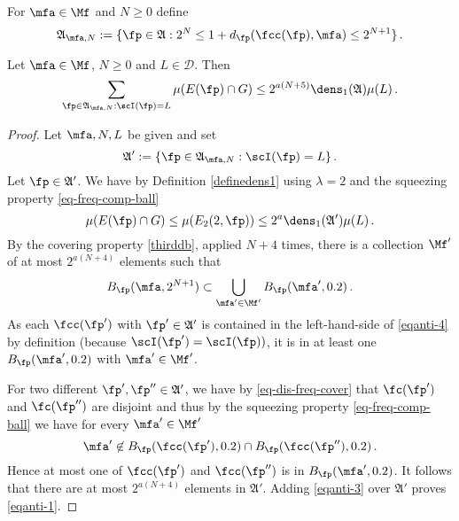 For $\mfa \in \Mf$ and $N\ge 0$ define
\begin{equation}\label{eqantidefap}
    \mathfrak{A}_{\mfa,N}:=\{\fp\in\mathfrak{A}: 2^{N}\le 1+d_{\fp}(\fcc(\fp), \mfa)\le 2^{N+1}\} \, .
\end{equation}


\begin{lemma}
\label{stack-density}
\leanok
{}
Let $\mfa \in \Mf$, $N\ge 0$ and
$L\in \mathcal{D}$. Then
\begin{equation}\label{eqanti-1}
    \sum_{\fp\in\mathfrak{A}_{\mfa,N}:\scI(\fp)=L}\mu(E(\fp)\cap G)\le 2^{a(N+5)}\dens_1(\mathfrak{A})\mu(L)\, .
\end{equation}
\end{lemma}
\begin{proof}
\leanok
Let $\mfa,N,L$ be given and set
\begin{equation}
\mathfrak{A}':=\{\fp\in\mathfrak{A}_{\mfa,N}:\scI(\fp)=L\}\, .
\end{equation}
Let
$\fp\in\mathfrak{A}'$.
We have
by Definition \eqref{definedens1}
using $\lambda=2$ and the squeezing property \eqref{eq-freq-comp-ball}
\begin{equation}\label{eqanti-3}
\mu(E(\fp)\cap G)\le \mu(E_2(2, \fp))\le 2^{a}\dens_1(\mathfrak{A}')\mu(L)\, .
\end{equation}
By the covering property \eqref{thirddb}, applied $N+4$ times, there is a collection $\Mf'$ of at most $2^{a(N+4)}$
elements such that
\begin{equation}\label{eqanti-4}
    B_{\fp}(\mfa, 2^{N+1})\subset \bigcup_{\mfa'\in \Mf'}
    B_{\fp}(\mfa', 0.2)\, .
\end{equation}
As each $\fcc(\fp')$ with $\fp'\in \mathfrak{A}'$
is contained in the left-hand-side
of \eqref{eqanti-4}
by definition (because $\scI(\fp') = \scI(\fp))$, it is in at least one $B_{\fp}(\mfa', 0.2)$
with $\mfa'\in \Mf'$.


For two different $\fp',\fp''\in \mathfrak{A}'$, we have by
\eqref{eq-dis-freq-cover} that
$\fc(\fp')$ and $\fc(\fp'')$ are disjoint and thus by the squeezing property \eqref{eq-freq-comp-ball} we have for every $\mfa'\in \Mf'$
\begin{equation}
    \mfa'\not\in B_{\fp}(\fcc(\fp'), 0.2)\cap
B_{\fp}(\fcc(\fp''), 0.2)\, .
\end{equation}
Hence at most one of $\fcc(\fp')$
and $\fcc(\fp'')$ is in
$B_{\fp}(\mfa', 0.2)$.
It follows that there are at most $2^{a(N+4)}$ elements in
$\mathfrak{A}'$. Adding \eqref{eqanti-3} over $\mathfrak{A}'$ proves
\eqref{eqanti-1}.
\end{proof}


